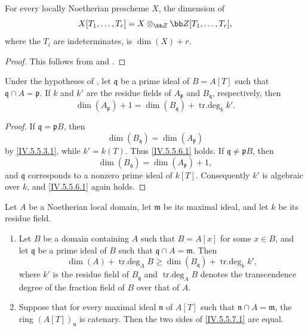 \begin{corollary}[5.5.5]
\label{IV.5.5.5}
For every locally Noetherian prescheme $X$, the dimension of
\[
X[T_1,\ldots,T_r]
  =X\otimes_{\bb Z}\bb Z[T_1,\ldots,T_r],
\]
where the $T_i$ are indeterminates, is $\dim(X)+r$.
\end{corollary}

\begin{proof}
This follows from  and .
\end{proof}

\begin{corollary}[5.5.6]
\label{IV.5.5.6}
Under the hypotheses of , let $\mathfrak q$ be a
prime ideal of $B=A[T]$ such that
$\mathfrak q\cap A=\mathfrak p$.
If $k$ and $k'$ are the residue fields of $A_{\mathfrak p}$ and
$B_{\mathfrak q}$, respectively, then
\begin{equation}
\dim(A_{\mathfrak p})+1
 =\dim(B_{\mathfrak q})+\operatorname{tr.deg}_k k'.
\tag{5.5.6.1}\label{IV.5.5.6.1}
\end{equation}
\end{corollary}

\begin{proof}

If $\mathfrak q=\mathfrak pB$, then
\[
\dim(B_{\mathfrak q})=\dim(A_{\mathfrak p})
\]
by \eqref{IV.5.5.3.1}, while $k'=k(T)$.
Thus \eqref{IV.5.5.6.1} holds.
If $\mathfrak q\neq\mathfrak pB$, then
\[
\dim(B_{\mathfrak q})=\dim(A_{\mathfrak p})+1,
\]
and $\mathfrak q$ corresponds to a nonzero prime ideal of $k[T]$.
Consequently $k'$ is algebraic over $k$, and
\eqref{IV.5.5.6.1} again holds.
\end{proof}

\begin{lemma}[5.5.7]
\label{IV.5.5.7}
Let $A$ be a Noetherian local domain, let $\mathfrak m$ be its
maximal ideal, and let $k$ be its residue field.
\begin{enumerate}[{\rm(i)}]
\item
{}
\label{IV.5.5.7.i}
Let $B$ be a domain containing $A$ such that $B=A[x]$ for some
$x\in B$, and let $\mathfrak q$ be a prime ideal of $B$ such that
$\mathfrak q\cap A=\mathfrak m$.
Then
\begin{equation}
\dim(A)+\operatorname{tr.deg}_A B
 \geq\dim(B_{\mathfrak q})+\operatorname{tr.deg}_k k',
\tag{5.5.7.1}\label{IV.5.5.7.1}
\end{equation}
where $k'$ is the residue field of $B_{\mathfrak q}$ and
$\operatorname{tr.deg}_A B$ denotes the transcendence degree of the
fraction field of $B$ over that of $A$.

\item
{}
\label{IV.5.5.7.ii}
Suppose that for every maximal ideal $\mathfrak n$ of $A[T]$ such
that $\mathfrak n\cap A=\mathfrak m$, the ring
$(A[T])_{\mathfrak n}$ is catenary.
Then the two sides of \eqref{IV.5.5.7.1} are equal.
\end{enumerate}
\end{lemma}

